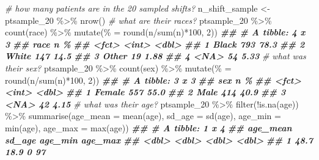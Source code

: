 \documentclass[
]{article}
\newenvironment{Shaded}{\begin{snugshade}}{\end{snugshade}}
\newcommand{\AttributeTok}[1]{\textcolor[rgb]{0.77,0.63,0.00}{#1}}
\newcommand{\CommentTok}[1]{\textcolor[rgb]{0.56,0.35,0.01}{\textit{#1}}}
\newcommand{\DecValTok}[1]{\textcolor[rgb]{0.00,0.00,0.81}{#1}}
\newcommand{\DocumentationTok}[1]{\textcolor[rgb]{0.56,0.35,0.01}{\textbf{\textit{#1}}}}
\newcommand{\FunctionTok}[1]{\textcolor[rgb]{0.00,0.00,0.00}{#1}}
\newcommand{\NormalTok}[1]{#1}
\newcommand{\OtherTok}[1]{\textcolor[rgb]{0.56,0.35,0.01}{#1}}
\newcommand{\SpecialCharTok}[1]{\textcolor[rgb]{0.00,0.00,0.00}{#1}}
\newcommand{\StringTok}[1]{\textcolor[rgb]{0.31,0.60,0.02}{#1}}
\begin{document}
\begin{Shaded}
\begin{Highlighting}[]

\CommentTok{\# how many patients are in the 20 sampled shifts?}
\NormalTok{n\_shift\_sample }\OtherTok{\textless{}{-}}\NormalTok{ ptsample\_20 }\SpecialCharTok{\%\textgreater{}\%}
  \FunctionTok{nrow}\NormalTok{()}
\CommentTok{\# what are their races?}
\NormalTok{ptsample\_20 }\SpecialCharTok{\%\textgreater{}\%}
  \FunctionTok{count}\NormalTok{(race) }\SpecialCharTok{\%\textgreater{}\%}
  \FunctionTok{mutate}\NormalTok{(}\StringTok{\textasciigrave{}}\AttributeTok{\%}\StringTok{\textasciigrave{}} \OtherTok{=} \FunctionTok{round}\NormalTok{(n}\SpecialCharTok{/}\FunctionTok{sum}\NormalTok{(n)}\SpecialCharTok{*}\DecValTok{100}\NormalTok{, }\DecValTok{2}\NormalTok{))}
\DocumentationTok{\#\# \# A tibble: 4 x 3}
\DocumentationTok{\#\#   race      n   \textasciigrave{}\%\textasciigrave{}}
\DocumentationTok{\#\#   \textless{}fct\textgreater{} \textless{}int\textgreater{} \textless{}dbl\textgreater{}}
\DocumentationTok{\#\# 1 Black   793 78.3 }
\DocumentationTok{\#\# 2 White   147 14.5 }
\DocumentationTok{\#\# 3 Other    19  1.88}
\DocumentationTok{\#\# 4 \textless{}NA\textgreater{}     54  5.33}
\CommentTok{\# what was their sex?}
\NormalTok{ptsample\_20 }\SpecialCharTok{\%\textgreater{}\%}
  \FunctionTok{count}\NormalTok{(sex) }\SpecialCharTok{\%\textgreater{}\%}
  \FunctionTok{mutate}\NormalTok{(}\StringTok{\textasciigrave{}}\AttributeTok{\%}\StringTok{\textasciigrave{}} \OtherTok{=} \FunctionTok{round}\NormalTok{(n}\SpecialCharTok{/}\FunctionTok{sum}\NormalTok{(n)}\SpecialCharTok{*}\DecValTok{100}\NormalTok{, }\DecValTok{2}\NormalTok{))}
\DocumentationTok{\#\# \# A tibble: 3 x 3}
\DocumentationTok{\#\#   sex        n   \textasciigrave{}\%\textasciigrave{}}
\DocumentationTok{\#\#   \textless{}fct\textgreater{}  \textless{}int\textgreater{} \textless{}dbl\textgreater{}}
\DocumentationTok{\#\# 1 Female   557 55.0 }
\DocumentationTok{\#\# 2 Male     414 40.9 }
\DocumentationTok{\#\# 3 \textless{}NA\textgreater{}      42  4.15}
\CommentTok{\# what was their age?}
\NormalTok{ptsample\_20 }\SpecialCharTok{\%\textgreater{}\%}
  \FunctionTok{filter}\NormalTok{(}\SpecialCharTok{!}\FunctionTok{is.na}\NormalTok{(age)) }\SpecialCharTok{\%\textgreater{}\%}
  \FunctionTok{summarise}\NormalTok{(}\AttributeTok{age\_mean =} \FunctionTok{mean}\NormalTok{(age), }
            \AttributeTok{sd\_age =} \FunctionTok{sd}\NormalTok{(age),}
            \AttributeTok{age\_min =} \FunctionTok{min}\NormalTok{(age), }
            \AttributeTok{age\_max =} \FunctionTok{max}\NormalTok{(age))}
\DocumentationTok{\#\# \# A tibble: 1 x 4}
\DocumentationTok{\#\#   age\_mean sd\_age age\_min age\_max}
\DocumentationTok{\#\#      \textless{}dbl\textgreater{}  \textless{}dbl\textgreater{}   \textless{}dbl\textgreater{}   \textless{}dbl\textgreater{}}
\DocumentationTok{\#\# 1     48.7   18.9       0      97}
\end{Highlighting}
\end{Shaded}
\end{document}
